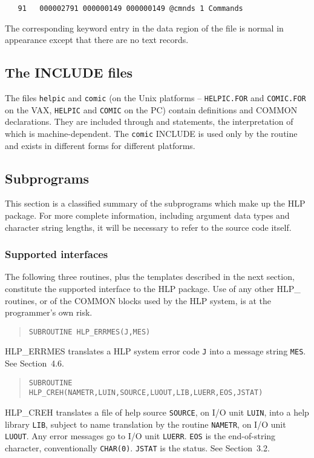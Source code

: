 \begin{verbatim}
   91   000002791 000000149 000000149 @cmnds 1 Commands
\end{verbatim}

The corresponding keyword entry in the data region of the file is
normal in appearance except that there are no text records.

\subsection{The INCLUDE files}
The files
{\tt helpic} and {\tt comic}
(on the Unix platforms -- {\tt HELPIC.FOR} and {\tt COMIC.FOR} on the VAX,
{\tt HELPIC} and {\tt COMIC} on the PC) contain definitions and
COMMON declarations.  They are included through 
and  statements, the
interpretation of which is machine-dependent.
The {\tt comic} INCLUDE is used only by the 
routine and exists in different forms for different platforms.

\subsection{Subprograms}
This section is a classified summary of the subprograms
which make up the HLP package.  For more complete information,
including argument data types and character string lengths, it will
be necessary to refer to the source code itself.

\subsubsection{Supported interfaces}
The following three routines, plus the templates described in the
next section, constitute the supported interface
to the HLP package.  Use of any other HLP\_ routines, or of the
COMMON blocks used by the HLP system, is at the
programmer's own risk.
\begin{verse}
{\tt SUBROUTINE HLP\_ERRMES(J,MES)}
\end{verse}
HLP\_ERRMES translates a HLP system error code {\tt J}
into a message string {\tt MES}.  See Section~4.6.

\begin{verse}
{\tt SUBROUTINE HLP\_CREH(NAMETR,LUIN,SOURCE,LUOUT,LIB,LUERR,EOS,JSTAT)}
\end{verse}
HLP\_CREH translates a file of help source {\tt SOURCE},
on I/O unit {\tt LUIN}, into a help library {\tt LIB}, subject
to name translation by the routine {\tt NAMETR}, on I/O
unit {\tt LUOUT}.  Any error messages go to I/O unit {\tt LUERR}.
{\tt EOS} is the end-of-string character, conventionally {\tt CHAR(0)}.
{\tt JSTAT} is the status.  See Section~3.2.

